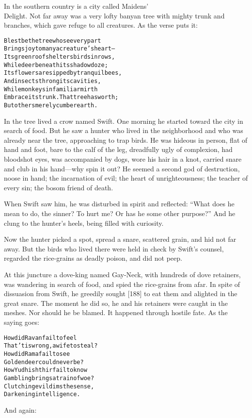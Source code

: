 \documentclass{article}
\renewenvironment{verbatim}{\begin{alltt}\normalfont\begin{centering}}{\end{centering}\end{alltt}}
\begin{document}
In the southern country is a city called Maidens'\\Delight. Not far
away was a very lofty banyan tree with mighty trunk and branches,
which gave refuge to all creatures. As the verse puts it:

\begin{verbatim}
Blest be the tree whose every part
Brings joy to many a creature's heart--
Its green roof shelters birds in rows,
While deer beneath its shadow doze;
Its flowers are sipped by tranquil bees,
And insects throng its cavities,
While monkeys in familiar mirth
Embrace its trunk. That tree has worth;
But others merely cumber earth.
\end{verbatim}
In the tree lived a crow named Swift. One morning he started toward
the city in search of food. But he saw a hunter who lived in the
neighborhood and who was already near the tree, approaching to trap
birds. He was hideous in person, flat of hand and foot, bare to the
calf of the leg, dreadfully ugly of complexion, had bloodshot eyes,
was accompanied by dogs, wore his hair in a knot, carried snare and
club in his hand---why spin it out? He seemed a second god of
destruction, noose in hand; the incarnation of evil; the heart of
unrighteousness; the teacher of every sin; the bosom friend of
death.

When Swift saw him, he was disturbed in spirit and reflected:
``What does he mean to do, the sinner? To hurt me? Or has he some other purpose?''
And he clung to the hunter's heels, being filled with curiosity.

Now the hunter picked a spot, spread a snare, scattered grain, and
hid not far away. But the birds who lived there were held in check
by Swift's counsel, regarded the rice-grains as deadly poison, and
did not peep.

At this juncture a dove-king named Gay-Neck, with hundreds of dove
retainers, was wandering in search of food, and spied the
rice-grains from afar. In spite of dissuasion from Swift, he
greedily sought [188] to eat them and alighted in the great snare.
The moment he did so, he and his retainers were caught in the
meshes. Nor should he be blamed. It happened through hostile fate.
As the saying goes:

\begin{verbatim}
How did Ravan fail to feel
That 'tis wrong, a wife to steal?
How did Rama fail to see
Golden deer could never be?
How Yudhishthir fail to know
Gambling brings a train of woe?
Clutching evil dims the sense,
Darkening intelligence.
\end{verbatim}
And again:
\end{document}
